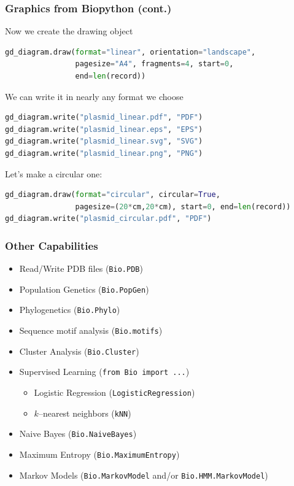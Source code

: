 \documentclass[xcolor=table,10pt,final]{beamer}
\begin{document}
\begin{frame}[fragile]
	\frametitle{Graphics from Biopython (cont.)}
	Now we create the drawing object
	\begin{lstlisting}[language=python]
gd_diagram.draw(format="linear", orientation="landscape",
                pagesize="A4", fragments=4, start=0,
                end=len(record))
	\end{lstlisting}
	We can write it in nearly any format we choose
	\begin{lstlisting}[language=python]
gd_diagram.write("plasmid_linear.pdf", "PDF")
gd_diagram.write("plasmid_linear.eps", "EPS")
gd_diagram.write("plasmid_linear.svg", "SVG")
gd_diagram.write("plasmid_linear.png", "PNG")
	\end{lstlisting}
	Let's make a circular one:
	\begin{lstlisting}[language=python]
gd_diagram.draw(format="circular", circular=True,
                pagesize=(20*cm,20*cm), start=0, end=len(record))
gd_diagram.write("plasmid_circular.pdf", "PDF")
	\end{lstlisting}
\end{frame}


\begin{frame}[fragile]
	\frametitle{Other Capabilities}
	\begin{itemize}
		\item Read/Write PDB files (\texttt{Bio.PDB})
		\item Population Genetics (\texttt{Bio.PopGen})
		\item Phylogenetics (\texttt{Bio.Phylo})
		\item Sequence motif analysis (\texttt{Bio.motifs})
		\item Cluster Analysis (\texttt{Bio.Cluster})
		\item Supervised Learning (\texttt{from Bio import ...})
		\begin{itemize}
			\item Logistic Regression (\texttt{LogisticRegression})	
			\item $k$--nearest neighbors (\texttt{kNN})
		\end{itemize}
		\item Naive Bayes (\texttt{Bio.NaiveBayes})
		\item Maximum Entropy (\texttt{Bio.MaximumEntropy})
		\item Markov Models (\texttt{Bio.MarkovModel} and/or \texttt{Bio.HMM.MarkovModel})
	\end{itemize}
\end{frame}
\end{document}
